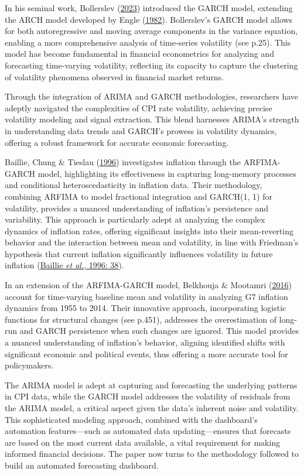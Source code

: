 \documentclass[11pt,preprint, authoryear]{elsarticle}
\numberwithin{equation}{section}
\numberwithin{figure}{section}
\numberwithin{table}{section}
\begin{document}
In his seminal work, Bollerslev
(\protect\hyperlink{ref-Bollerslev2023}{2023}) introduced the GARCH
model, extending the ARCH model developed by Engle
(\protect\hyperlink{ref-Engle1982}{1982}). Bollerslev's GARCH model
allows for both autoregressive and moving average components in the
variance equation, enabling a more comprehensive analysis of time-series
volatility (see p.25). This model has become fundamental in financial
econometrics for analyzing and forecasting time-varying volatility,
reflecting its capacity to capture the clustering of volatility
phenomena observed in financial market returns.

Through the integration of ARIMA and GARCH methodologies, researchers
have adeptly navigated the complexities of CPI rate volatility,
achieving precise volatility modeling and signal extraction. This blend
harnesses ARIMA's strength in understanding data trends and GARCH's
prowess in volatility dynamics, offering a robust framework for accurate
economic forecasting.

Baillie, Chung \& Tieslau (\protect\hyperlink{ref-Baillie1996}{1996})
investigates inflation through the ARFIMA-GARCH model, highlighting its
effectiveness in capturing long-memory processes and conditional
heteroscedasticity in inflation data. Their methodology, combining
ARFIMA to model fractional integration and GARCH(1, 1) for volatility,
provides a nuanced understanding of inflation's persistence and
variability. This approach is particularly adept at analyzing the
complex dynamics of inflation rates, offering significant insights into
their mean-reverting behavior and the interaction between mean and
volatility, in line with Friedman's hypothesis that current inflation
significantly influences volatility in future inflation
(\protect\hyperlink{ref-Baillie1996}{Baillie \emph{et al.}, 1996: 38}).

In an extension of the ARFIMA-GARCH model, Belkhouja \& Mootamri
(\protect\hyperlink{ref-Belkhouja2016}{2016}) account for time-varying
baseline mean and volatility in analyzing G7 inflation dynamics from
1955 to 2014. Their innovative approach, incorporating logistic
functions for structural changes (see p.451), addresses the
overestimation of long-run and GARCH persistence when such changes are
ignored. This model provides a nuanced understanding of inflation's
behavior, aligning identified shifts with significant economic and
political events, thus offering a more accurate tool for policymakers.

The ARIMA model is adept at capturing and forecasting the underlying
patterns in CPI data, while the GARCH model addresses the volatility of
residuals from the ARIMA model, a critical aspect given the data's
inherent noise and volatility. This sophisticated modeling approach,
combined with the dashboard's automation features---such as automated
data updating---ensures that forecasts are based on the most current
data available, a vital requirement for making informed financial
decisions. The paper now turns to the methodology followed to build an
automated forecasting dashboard.
\end{document}
